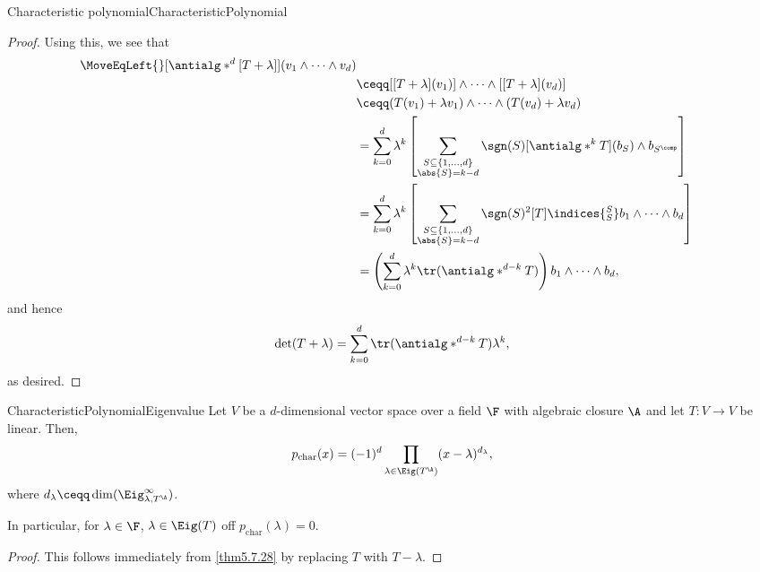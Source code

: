 \begin{thm}{Characteristic polynomial}{CharacteristicPolynomial}
\begin{proof}
		Using this, we see that
		\begin{equation}
			\begin{split}
				\MoveEqLeft {}
				[\antialg* ^d[T+\lambda ]](v_1\wedge \cdots \wedge v_d) \\
				& \ceqq [[T+\lambda ](v_1)]\wedge \cdots \wedge [[T+\lambda ](v_d)] \\
				& \ceqq (T(v_1)+\lambda v_1)\wedge \cdots \wedge (T(v_d)+\lambda v_d) \\
				& =\sum _{k=0}^d\lambda ^k\left[ \sum _{\substack{S\subseteq \{ 1,\ldots ,d\} \\ \abs{S}=k-d}}\sgn (S)[\antialg* ^kT](b_S)\wedge b_{S^{\comp}}\right] \\
				& =\sum _{k=0}^d\lambda ^k\left[ \sum _{\substack{S\subseteq \{ 1,\ldots ,d\} \\ \abs{S}=k-d}}\sgn (S)^2[T]\indices{^S_S}b_1\wedge \cdots \wedge b_d\right] \\
				& =\left( \sum _{k=0}^d\lambda ^k\tr (\antialg* ^{d-k}T)\right) b_1\wedge \cdots \wedge b_d,
			\end{split}
		\end{equation}
		and hence
		\begin{equation}
			\det (T+\lambda )=\sum _{k=0}^d\tr (\antialg* ^{d-k}T)\lambda ^k,
		\end{equation}
		as desired.
	\end{proof}
\end{thm}
\begin{thm}{}{CharacteristicPolynomialEigenvalue}
	Let $V$ be a $d$-dimensional vector space over a field $\F$ with algebraic closure $\A$ and let $T\colon V\rightarrow V$ be linear.  Then,
	\begin{equation}
		p_{\operatorname{char}}(x)=(-1)^d\prod _{\lambda \in \Eig (T^{\A})}(x-\lambda )^{d_{\lambda}},
	\end{equation}
	where $d_{\lambda}\ceqq \dim (\Eig _{\lambda ,T^{\A}}^{\infty})$.
	\begin{rmk}
		In particular, for $\lambda \in \F$, $\lambda \in \Eig (T)$ off $p_{\operatorname{char}}(\lambda )=0$.
	\end{rmk}
	\begin{proof}
		This follows immediately from \cref{thm5.7.28} by replacing $T$ with $T-\lambda$.
	\end{proof}
\end{thm}
